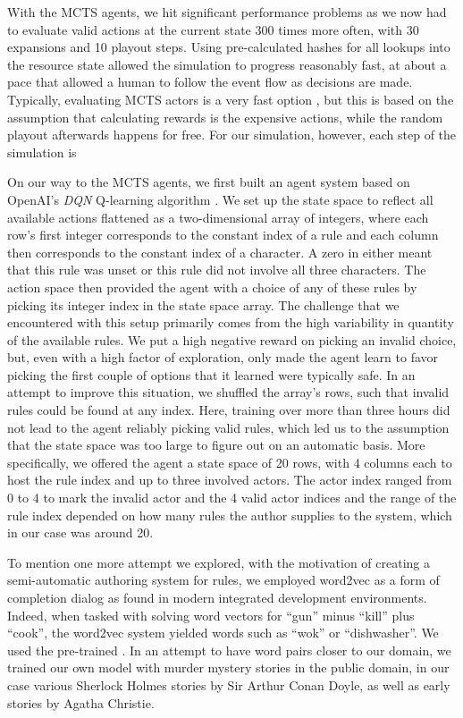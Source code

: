 With the MCTS agents, we hit significant performance problems as we now had to evaluate valid actions at the current state 300 times more often, with 30 expansions and 10 playout steps. Using pre-calculated hashes for all lookups into the resource state allowed the simulation to progress reasonably fast, at about a pace that allowed a human to follow the event flow as decisions are made. Typically, evaluating MCTS actors is a very fast option , but this is based on the assumption that calculating rewards is the expensive actions, while the random playout afterwards happens for free. For our simulation, however, each step of the simulation is

On our way to the MCTS agents, we first built an agent system based on OpenAI's \emph{DQN} Q-learning algorithm \cite{baselines}. We set up the state space to reflect all available actions flattened as a two-dimensional array of integers, where each row's first integer corresponds to the constant index of a rule and each column then corresponds to the constant index of a character. A zero in either meant that this rule was unset or this rule did not involve all three characters. The action space then provided the agent with a choice of any of these rules by picking its integer index in the state space array. The challenge that we encountered with this setup primarily comes from the high variability in quantity of the available rules. We put a high negative reward on picking an invalid choice, but, even with a high factor of exploration, only made the agent learn to favor picking the first couple of options that it learned were typically safe. In an attempt to improve this situation, we shuffled the array's rows, such that invalid rules could be found at any index. Here, training over more than three hours did not lead to the agent reliably picking valid rules, which led us to the assumption that the state space was too large to figure out on an automatic basis. More specifically, we offered the agent a state space of 20 rows, with 4 columns each to host the rule index and up to three involved actors. The actor index ranged from 0 to 4 to mark the invalid actor and the 4 valid actor indices and the range of the rule index depended on how many rules the author supplies to the system, which in our case was around 20.

To mention one more attempt we explored, with the motivation of creating a semi-automatic authoring system for rules, we employed word2vec  as a form of completion dialog as found in modern integrated development environments.
Indeed, when tasked with solving word vectors for \enquote{gun} minus \enquote{kill} plus \enquote{cook}, the word2vec system yielded words such as \enquote{wok} or \enquote{dishwasher}.
We used the pre-trained .
In an attempt to have word pairs closer to our domain, we trained our own model with murder mystery stories in the public domain, in our case various Sherlock Holmes stories by Sir Arthur Conan Doyle, as well as early stories by Agatha Christie.

